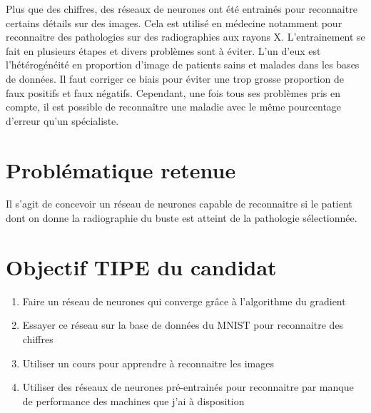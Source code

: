 \documentclass[french,12pt]{article}
\begin{document}
Plus que des chiffres, des réseaux de neurones ont été entrainés pour reconnaitre certains détails sur des images. Cela est utilisé en médecine notamment pour reconnaitre des pathologies sur des radiographies aux rayons X. L’entrainement se fait en plusieurs étapes  et divers problèmes sont à éviter. L’un d’eux est l'hétérogénéité en proportion d’image de patients sains et malades dans les bases de données. Il faut corriger ce biais pour éviter une trop grosse proportion de faux positifs et faux négatifs. Cependant, une fois tous ses problèmes pris en compte, il est possible de reconnaître une maladie avec le même pourcentage d’erreur qu’un spécialiste.
\cite{cours}
\cite{radio}
\\

\section*{Problématique retenue}
Il s’agit de concevoir un réseau de neurones capable de reconnaitre si le patient dont on donne la radiographie du buste est atteint de la pathologie sélectionnée.

\section*{Objectif TIPE du candidat}
\begin{enumerate}[leftmargin=*,itemsep=0cm]
    \item Faire un réseau de neurones qui converge grâce à l’algorithme du gradient
    \item Essayer ce réseau sur la base de données du MNIST pour reconnaitre des chiffres
    \item Utiliser un cours pour apprendre à reconnaitre les images
    \item Utiliser des réseaux de neurones pré-entrainés pour reconnaitre par manque de performance des machines que j’ai à disposition
\end{enumerate}
\end{document}
